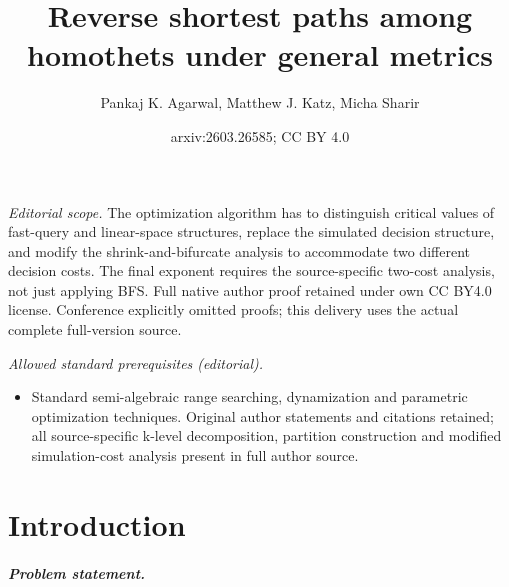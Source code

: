 \documentclass[11pt]{article}
\title{Reverse shortest paths among homothets under general metrics}
\author{Pankaj K. Agarwal, Matthew J. Katz, Micha Sharir}
\date{arxiv:2603.26585; CC BY 4.0}
\newif\ifsocgproc
\theoremstyle{definition}
\begin{document}
\maketitle
\noindent\textit{Editorial scope.} The optimization algorithm has to distinguish critical values of fast-query and linear-space structures, replace the simulated decision structure, and modify the shrink-and-bifurcate analysis to accommodate two different decision costs. The final exponent requires the source-specific two-cost analysis, not just applying BFS. Full native author proof retained under own CC BY4.0 license. Conference explicitly omitted proofs; this delivery uses the actual complete full-version source.\par\medskip
\noindent\textit{Allowed standard prerequisites (editorial).}\begin{itemize}
\item Standard semi-algebraic range searching, dynamization and parametric optimization techniques. Original author statements and citations retained; all source-specific k-level decomposition, partition construction and modified simulation-cost analysis present in full author source.
\end{itemize}\medskip
\section{Introduction}
\label{sec:intro}
%
\ifsocgproc 
\subparagraph*{Problem statement.}
\else
\end{document}
